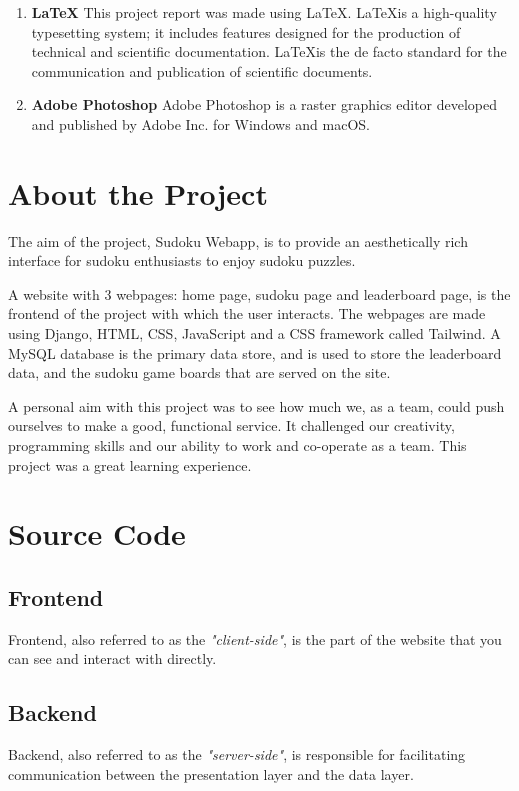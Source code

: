\documentclass[12pt, a4paper]{report}
\begin{document}
\begin{enumerate}
        \item \textbf{\LaTeX} \newline
        This project report was made using \LaTeX. \LaTeX is a high-quality typesetting system; it includes features designed for the production of technical and scientific documentation. \LaTeX is the de facto standard for the communication and publication of scientific documents.
        \item \textbf{Adobe Photoshop} \newline
        Adobe Photoshop is a raster graphics editor developed and published by Adobe Inc. for Windows and macOS.
    \end{enumerate}
    
    
  \newpage
  \section{About the Project}
  The aim of the project, Sudoku Webapp, is to provide an aesthetically rich interface for sudoku enthusiasts to enjoy sudoku puzzles.\newline

  A website with 3 webpages: home page, sudoku page and leaderboard page, is the frontend of the project with which the user interacts. The webpages are made using Django, HTML, CSS, JavaScript and a CSS framework called Tailwind. A MySQL database is the primary data store, and is used to store the leaderboard data, and the sudoku game boards that are served on the site.\newline

  A personal aim with this project was to see how much we, as a team, could push ourselves to make a good, functional service. It challenged our creativity, programming skills and our ability to work and co-operate as a team. This project was a great learning experience.

  
  \newpage
  \section{Source Code}
    \subsection{Frontend}
    Frontend, also referred to as the \emph{"client-side"}, is the part of the website that you can see and interact with directly.
    
    \subsection{Backend}
    Backend, also referred to as the \emph{"server-side"}, is responsible for facilitating communication between the presentation layer and the data layer.
    
\end{document}
